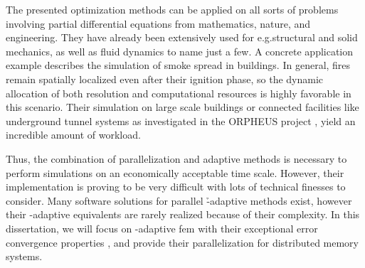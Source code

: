 
The presented optimization methods can be applied on all sorts of problems involving partial differential equations from mathematics, nature, and engineering. They have already been extensively used for e.g.\@ structural and solid mechanics, as well as fluid dynamics to name just a few.
A concrete application example describes the simulation of smoke spread in buildings.
In general, fires remain spatially localized even after their ignition phase, so the dynamic allocation of both resolution and computational resources is highly favorable in this scenario.
Their simulation on large scale buildings or connected facilities like underground tunnel systems as investigated in the ORPHEUS project \parencite{orpheus}, yield an incredible amount of workload.


Thus, the combination of parallelization and adaptive methods is necessary to perform simulations on an economically acceptable time scale. However, their implementation is proving to be very difficult with lots of technical finesses to consider.
Many software solutions for parallel \h-adaptive methods exist, however their \hp-adaptive equivalents are rarely realized because of their complexity.
In this dissertation, we will focus on \hp-adaptive \gls{fem} with their exceptional error convergence properties \parencite{guo1986,babuska1996}, and provide their parallelization for distributed memory systems.

